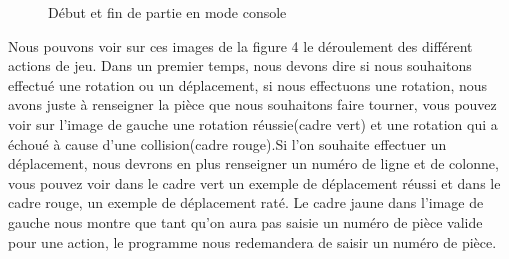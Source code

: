 \documentclass[12pt]{article}
\begin{document}
\begin{figure}[h]
\begin{center}
\end{center}
\caption{Début et fin de partie en mode console}
\end{figure}


Nous pouvons voir sur ces images de la figure 4 le déroulement des différent actions de jeu. Dans un premier temps, nous devons dire si nous souhaitons effectué une rotation ou un déplacement, si nous effectuons une rotation, nous avons juste à renseigner la pièce que nous souhaitons faire tourner, vous pouvez voir sur l'image de gauche une rotation réussie(cadre vert) et une rotation qui a échoué à cause d'une collision(cadre rouge).Si l'on souhaite effectuer un déplacement, nous devrons en plus renseigner un numéro de ligne et de colonne, vous pouvez voir dans le cadre vert un exemple de déplacement réussi et dans le cadre rouge, un exemple de déplacement raté. Le cadre jaune dans l'image de gauche nous montre que tant qu'on aura pas saisie un numéro de pièce valide pour une action, le programme nous redemandera de saisir un numéro de pièce.
\end{document}

